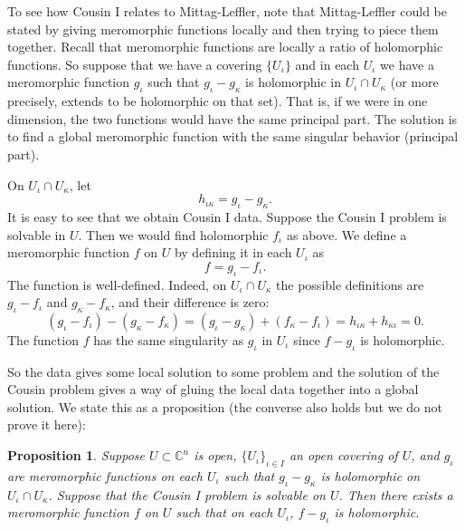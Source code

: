 \documentclass[12pt,openany]{book}
\newcommand{\C}{{\mathbb{C}}}
\theoremstyle{plain}
\newtheorem{prop}[thm]{Proposition}
\theoremstyle{remark}
\theoremstyle{definition}
\theoremstyle{exercise}
\theoremstyle{example}
\begin{document}
To see how Cousin I relates to Mittag-Leffler, note that Mittag-Leffler
could be stated by giving meromorphic functions locally and then trying
to piece them together.
Recall that meromorphic functions are locally
a ratio of holomorphic functions.
So suppose that we have a covering $\{ U_\iota \}$ and
in each $U_\iota$ we have a meromorphic function $g_\iota$ such that
$g_{\iota}-g_{\kappa}$
is holomorphic in $U_{\iota} \cap U_{\kappa}$ (or more precisely, extends to
be holomorphic on that set).  That is, if we were in one
dimension, the two functions would have the same principal part.
The solution is to find a global meromorphic function with the same
singular behavior (principal part).

On $U_\iota \cap U_\kappa$, let
\begin{equation*}
h_{\iota\kappa} = g_\iota-g_\kappa .
\end{equation*}
It is easy to see that we obtain Cousin I data.  Suppose
the Cousin I problem is solvable in $U$.  Then we would find
holomorphic $f_{\iota}$ as above.  We define a meromorphic function $f$
on $U$
by defining it in each $U_\iota$ as
\begin{equation*}
f = g_\iota - f_\iota .
\end{equation*}
The function is well-defined.  Indeed, on $U_\iota \cap U_\kappa$ the
possible definitions are
$g_\iota - f_\iota$
and
$g_\kappa - f_\kappa$, and their difference is zero:
\begin{equation*}
(g_\iota - f_\iota)-
(g_\kappa - f_\kappa)
=
(g_\iota - g_\kappa)
+
(f_\kappa - f_\iota)
=
h_{\iota\kappa}+h_{\kappa\iota} = 0.
\end{equation*}
The function $f$ has the same singularity as $g_\iota$ in $U_\iota$ since
$f-g_\iota$ is holomorphic.

So the data gives some local solution to some problem
and the solution of the Cousin problem gives
a way of gluing the local data together into a global solution.  We state
this as a proposition (the converse also holds but we do not prove it here):

\begin{prop}
Suppose $U \subset \C^n$ is open,
$\{ U_{\iota} \}_{\iota \in I}$ an open covering of $U$, and $g_\iota$
are meromorphic functions on each $U_\iota$ such that $g_\iota - g_\kappa$
is holomorphic on $U_\iota \cap U_\kappa$.  Suppose that the Cousin I
problem is solvable on $U$.  Then there exists a meromorphic function $f$ on
$U$ such that on each $U_\iota$, $f-g_\iota$ is holomorphic.
\end{prop}
\end{document}
